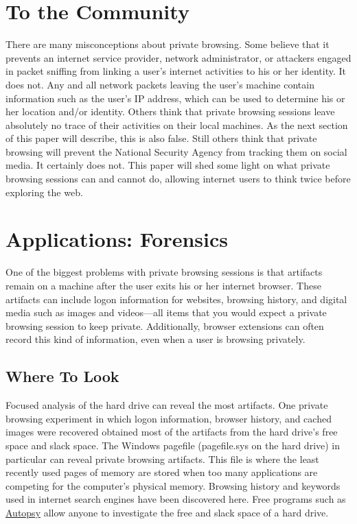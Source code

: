 \documentclass[pdftex,letterpaper,titlepage,12pt]{article}
\begin{document}
  \section{To the Community}
  There are many misconceptions about private browsing. Some believe that it
  prevents an internet service provider, network administrator, or attackers
  engaged in packet sniffing from linking a user's internet activities to his
  or her identity. It does not. Any and all network packets leaving the user's
  machine contain information such as the user's IP address, which can be used
  to determine his or her location and/or identity. Others think that private
  browsing sessions leave absolutely no trace of their activities on their
  local machines. As the next section of this paper will describe, this is also
  false. Still others think that private browsing will prevent the National
  Security Agency from tracking them on social media. It certainly does not.
  This paper will shed some light on what private browsing sessions can and
  cannot do, allowing internet users to think twice before exploring the web.

  \section{Applications: Forensics}
  One of the biggest problems with private browsing sessions is that artifacts
  remain on a machine after the user exits his or her internet browser. These
  artifacts can include logon information for websites, browsing history,
  and digital media such as images and videos---all items that you would expect
  a private browsing session to keep private. Additionally, browser extensions 
  can often record this kind of information, even when a user is browsing 
  privately.

    \subsection{Where To Look}
    Focused analysis of the hard drive can reveal the most artifacts.
    One private browsing experiment in which logon information, browser
    history, and cached images were recovered obtained most of the artifacts
    from the hard drive's free space and slack space.\cite{ohana13} The 
    Windows pagefile (pagefile.sys on the hard drive) in particular can reveal
    private browsing artifacts. This file is where the least recently used 
    pages of memory are stored when too many applications are competing for the
    computer's physical memory. Browsing history and keywords used in internet 
    search engines have been discovered here.\cite{said11} Free programs such 
	as \href{http://www.sleuthkit.org/autopsy/}{Autopsy} allow anyone to 
	investigate the free and slack space of a hard drive.
\end{document}
